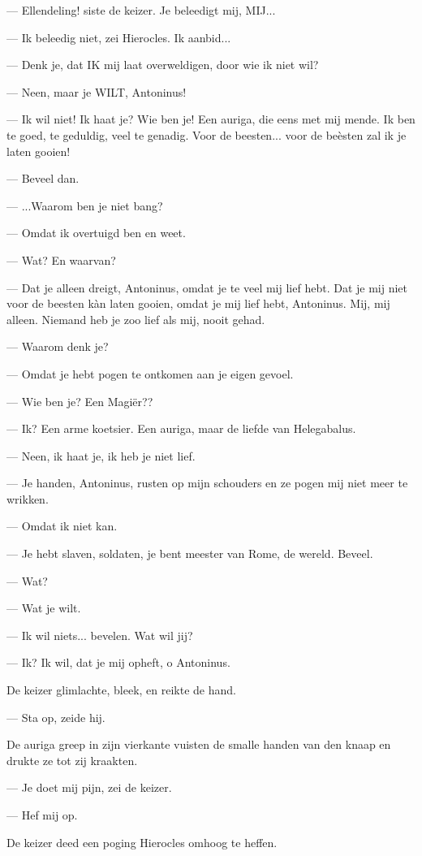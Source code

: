 \documentclass[a4paper, 12pt, oneside, dutch]{article}
\begin{document}
--- Ellendeling! siste de keizer. Je beleedigt mij, MIJ...

--- Ik beleedig niet, zei Hierocles. Ik aanbid...

--- Denk je, dat IK mij laat overweldigen, door wie ik niet wil?

--- Neen, maar je WILT, Antoninus!

--- Ik wil niet! Ik haat je? Wie ben je! Een auriga, die eens met mij mende. Ik ben te goed, te geduldig, veel te genadig. Voor de beesten... voor de beèsten zal ik je laten gooien!

--- Beveel dan.

--- ...Waarom ben je niet bang?

--- Omdat ik overtuigd ben en weet.

--- Wat? En waarvan?

--- Dat je alleen dreigt, Antoninus, omdat je te veel mij lief hebt. Dat je mij niet voor de beesten kàn laten gooien, omdat je mij lief hebt, Antoninus. Mij, mij alleen. Niemand heb je zoo lief als mij, nooit gehad.

--- Waarom denk je?

--- Omdat je hebt pogen te ontkomen aan je eigen gevoel.

--- Wie ben je? Een Magiër??

--- Ik? Een arme koetsier. Een auriga, maar de liefde van Helegabalus.

--- Neen, ik haat je, ik heb je niet lief.

--- Je handen, Antoninus, rusten op mijn schouders en ze pogen mij niet meer te wrikken.

--- Omdat ik niet kan.

--- Je hebt slaven, soldaten, je bent meester van Rome, de wereld. Beveel.

--- Wat?

--- Wat je wilt.

--- Ik wil niets... bevelen. Wat wil jij?

--- Ik? Ik wil, dat je mij opheft, o Antoninus.

De keizer glimlachte, bleek, en reikte de hand.

--- Sta op, zeide hij.

De auriga greep in zijn vierkante vuisten de smalle handen van den knaap en drukte ze tot zij kraakten.

--- Je doet mij pijn, zei de keizer.

--- Hef mij op.

De keizer deed een poging Hierocles omhoog te heffen.
\end{document}
